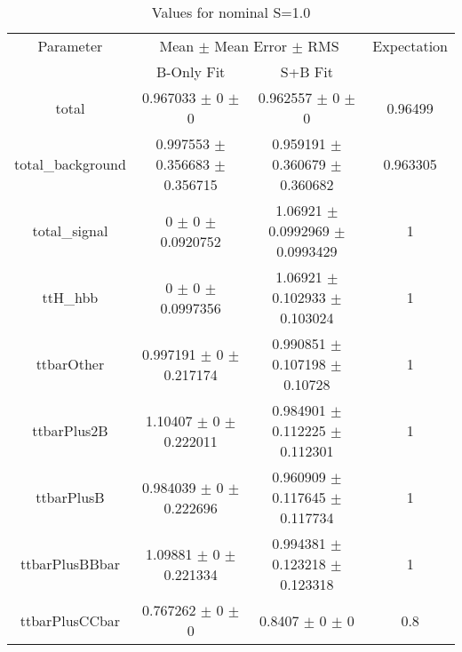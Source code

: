 \begin{table}
\centering
\caption{Values for nominal S=1.0}
\begin{tabular}{cccc}
\toprule
Parameter & \multicolumn{2}{c}{Mean $\pm$ Mean Error $\pm$ RMS} & Expectation\\
 & B-Only Fit & S+B Fit & \\
\midrule
total & \num{0.967033} $\pm$ \num{0} $\pm$ \num{0} & \num{0.962557} $\pm$ \num{0} $\pm$ \num{0} & \num{0.96499}\\
total\_background & \num{0.997553} $\pm$ \num{0.356683} $\pm$ \num{0.356715} & \num{0.959191} $\pm$ \num{0.360679} $\pm$ \num{0.360682} & \num{0.963305}\\
total\_signal & \num{0} $\pm$ \num{0} $\pm$ \num{0.0920752} & \num{1.06921} $\pm$ \num{0.0992969} $\pm$ \num{0.0993429} & \num{1}\\
ttH\_hbb & \num{0} $\pm$ \num{0} $\pm$ \num{0.0997356} & \num{1.06921} $\pm$ \num{0.102933} $\pm$ \num{0.103024} & \num{1}\\
ttbarOther & \num{0.997191} $\pm$ \num{0} $\pm$ \num{0.217174} & \num{0.990851} $\pm$ \num{0.107198} $\pm$ \num{0.10728} & \num{1}\\
ttbarPlus2B & \num{1.10407} $\pm$ \num{0} $\pm$ \num{0.222011} & \num{0.984901} $\pm$ \num{0.112225} $\pm$ \num{0.112301} & \num{1}\\
ttbarPlusB & \num{0.984039} $\pm$ \num{0} $\pm$ \num{0.222696} & \num{0.960909} $\pm$ \num{0.117645} $\pm$ \num{0.117734} & \num{1}\\
ttbarPlusBBbar & \num{1.09881} $\pm$ \num{0} $\pm$ \num{0.221334} & \num{0.994381} $\pm$ \num{0.123218} $\pm$ \num{0.123318} & \num{1}\\
ttbarPlusCCbar & \num{0.767262} $\pm$ \num{0} $\pm$ \num{0} & \num{0.8407} $\pm$ \num{0} $\pm$ \num{0} & \num{0.8}\\
\bottomrule
\end{tabular}
\end{table}